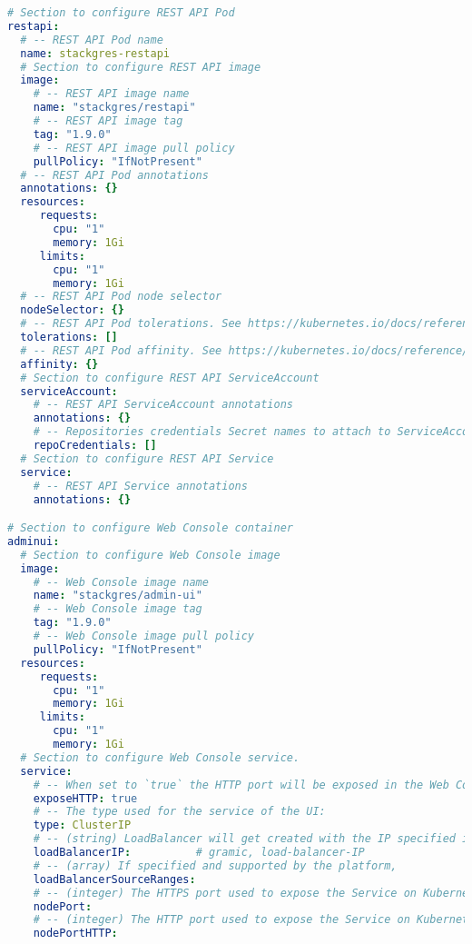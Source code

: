 \begin{lstlisting}[language=yaml, caption=StackGres-Citus - Helm Chart Manifest,captionpos=b,label={lst:stackgres_citus-values.yaml},breaklines=true]
# Section to configure REST API Pod
restapi:
  # -- REST API Pod name
  name: stackgres-restapi
  # Section to configure REST API image
  image:
    # -- REST API image name
    name: "stackgres/restapi"
    # -- REST API image tag
    tag: "1.9.0"
    # -- REST API image pull policy
    pullPolicy: "IfNotPresent"
  # -- REST API Pod annotations
  annotations: {}
  resources:
     requests:
       cpu: "1"
       memory: 1Gi
     limits:
       cpu: "1"
       memory: 1Gi
  # -- REST API Pod node selector
  nodeSelector: {}
  # -- REST API Pod tolerations. See https://kubernetes.io/docs/reference/generated/kubernetes-api/v1.27/#toleration-v1-core
  tolerations: []
  # -- REST API Pod affinity. See https://kubernetes.io/docs/reference/generated/kubernetes-api/v1.27/#affinity-v1-core
  affinity: {}
  # Section to configure REST API ServiceAccount
  serviceAccount:
    # -- REST API ServiceAccount annotations
    annotations: {}
    # -- Repositories credentials Secret names to attach to ServiceAccounts and Pods
    repoCredentials: []
  # Section to configure REST API Service
  service:
    # -- REST API Service annotations
    annotations: {}

# Section to configure Web Console container
adminui:
  # Section to configure Web Console image
  image:
    # -- Web Console image name
    name: "stackgres/admin-ui"
    # -- Web Console image tag
    tag: "1.9.0"
    # -- Web Console image pull policy
    pullPolicy: "IfNotPresent"
  resources:
     requests:
       cpu: "1"
       memory: 1Gi
     limits:
       cpu: "1"
       memory: 1Gi
  # Section to configure Web Console service.
  service:
    # -- When set to `true` the HTTP port will be exposed in the Web Console Service
    exposeHTTP: true
    # -- The type used for the service of the UI:
    type: ClusterIP
    # -- (string) LoadBalancer will get created with the IP specified in
    loadBalancerIP:          # gramic, load-balancer-IP
    # -- (array) If specified and supported by the platform,
    loadBalancerSourceRanges:
    # -- (integer) The HTTPS port used to expose the Service on Kubernetes nodes
    nodePort:
    # -- (integer) The HTTP port used to expose the Service on Kubernetes nodes
    nodePortHTTP:


\end{lstlisting}
